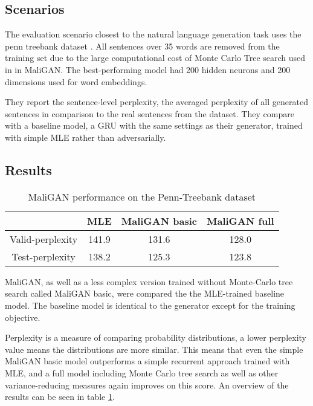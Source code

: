 \documentclass[a4paper,conference]{IEEEtran}
\begin{document}
\subsection{Scenarios}
The evaluation scenario closest to the natural language generation task uses the penn treebank dataset \cite{c25}. All sentences over 35 words are removed from the training set due to the large computational cost of Monte Carlo Tree search used in in MaliGAN. The best-performing model had  200 hidden neurons and 200 dimensions used for word embeddings.

They report the sentence-level perplexity, the averaged perplexity of all generated sentences in comparison to the real sentences from the dataset. They compare with a baseline model, a GRU with the same settings as their generator, trained with simple MLE rather than adversarially.

\subsection{Results}

\begin{table}[h]
\caption{MaliGAN performance on the Penn-Treebank dataset}
\label{table:MaliGAN-result}
\begin{center}
\begin{tabular}{|c|c|c|c|}
\hline
& MLE & MaliGAN basic & MaliGAN full\\
\hline
Valid-perplexity & 141.9 & 131.6 & 128.0\\
\hline
Test-perplexity & 138.2 & 125.3 & 123.8\\
\hline
\end{tabular}
\end{center}
\end{table}

MaliGAN, as well as a less complex version trained without Monte-Carlo tree search called MaliGAN basic, were compared the the MLE-trained baseline model. The baseline model is identical to the generator except for the training objective. 

Perplexity is a measure of comparing probability distributions, a lower perplexity value means the distributions are more similar. This means that even the simple MaliGAN basic model outperforms a simple recurrent approach trained with MLE, and a full model including Monte Carlo tree search as well as other variance-reducing measures again improves on this score. An overview of the results can be seen in table \ref{table:MaliGAN-result}.
\end{document}
